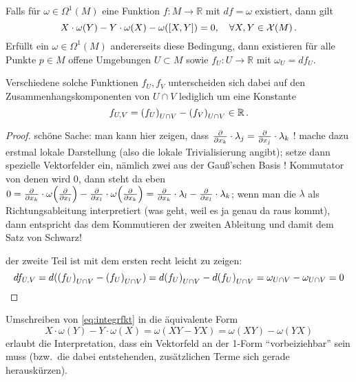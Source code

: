 \documentclass[../H_Analysis_main.tex]{subfiles}
\begin{document}
\begin{satz}[Integrabilitätsbedingung]\label{satz:integrab1form}
Falls für $\omega \in \Omega^1(M)$ eine Funktion $f: M \rightarrow \mathbb{R}$ mit $df = \omega$ existiert, dann gilt
\begin{equation}\label{eq:integrfkt}
X \cdot \omega(Y) - Y \cdot \omega(X) - \omega\qty([X, Y]) = 0, \quad \forall X, Y \in \mathcal{X}(M) \, .
\end{equation}
Erfüllt ein $\omega \in \Omega^1(M)$ andererseits diese Bedingung, dann existieren für alle Punkte $p \in M$ offene Umgebungen $U \subset M$ sowie $f_U: U \rightarrow \mathbb{R}$ mit $\omega_U = df_U$.

Verschiedene solche Funktionen $f_U, f_V$ unterscheiden sich dabei auf den Zusammenhangskomponenten von $U \cap V$ lediglich um eine Konstante
\begin{equation}
f_{U, V} = \qty(f_U)_{U \cap V} - \qty(f_V)_{U \cap V} \in \mathbb{R} \, .
\end{equation}
\end{satz}
\begin{proof}
schöne Sache: man kann hier zeigen, dass $\pdv{x_k} \cdot \lambda_j = \pdv{x_j} \cdot \lambda_k$ ! mache dazu erstmal lokale Darstellung (also die lokale Trivialisierung angibt); setze dann spezielle Vektorfelder ein, nämlich zwei aus der Gauß'schen Basis ! Kommutator von denen wird 0, dann steht da eben $0 = \pdv{x_k} \cdot \omega\qty(\pdv{x_l}) - \pdv{x_l} \cdot \omega\qty(\pdv{x_k}) = \pdv{x_k} \cdot \lambda_l - \pdv{x_l} \cdot \lambda_k$; wenn man die $\lambda$ als Richtungsableitung interpretiert (was geht, weil es ja genau da raus kommt), dann entspricht das dem Kommutieren der zweiten Ableitung und damit dem Satz von Schwarz!


der zweite Teil ist mit dem ersten recht leicht zu zeigen:
\begin{equation*}
d f_{U, V} = d\qty(\qty(f_U)_{U \cap V} - \qty(f_U)_{U \cap V}) = d\qty(f_U)_{U \cap V} - d\qty(f_U)_{U \cap V} = \omega_{U \cap V} - \omega_{U \cap V} = 0
\end{equation*}
\end{proof}

Umschreiben von \eqref{eq:integrfkt} in die äquivalente Form
\begin{equation*}
X \cdot \omega(Y) - Y \cdot \omega(X) = \omega(XY - YX) = \omega(XY) - \omega(YX)
\end{equation*}
erlaubt die Interpretation, dass ein Vektorfeld an der 1-Form \enquote{vorbeiziehbar} sein muss (bzw.~die dabei entstehenden, zusätzlichen Terme sich gerade herauskürzen).
\end{document}
